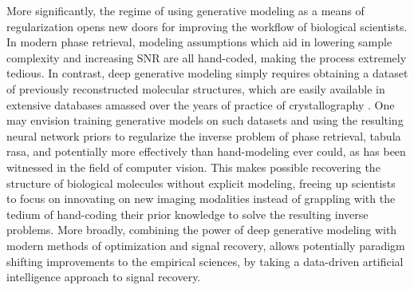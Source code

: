 \documentclass[11pt]{article}
\begin{document}
 More significantly, the regime of using generative modeling as a means of regularization opens new doors for improving the workflow of biological scientists. In modern phase retrieval, modeling assumptions which aid in lowering sample complexity and increasing SNR are all hand-coded, making the process extremely tedious. In contrast, deep generative modeling simply requires obtaining a dataset of previously reconstructed molecular structures, which are easily available in extensive databases amassed over the years of practice of crystallography \cite{velankar2009pdbe}. One may envision training generative models on such datasets and using the resulting neural network priors to regularize the inverse problem of phase retrieval, tabula rasa, and potentially more effectively than hand-modeling ever could, as has been witnessed in the field of computer vision. This makes possible recovering the structure of biological molecules without explicit modeling, freeing up scientists to focus on innovating on new imaging modalities instead of grappling with the tedium of hand-coding their prior knowledge to solve the resulting inverse problems. More broadly, combining the power of deep generative modeling with modern methods of optimization and signal recovery, allows potentially paradigm shifting improvements to the empirical sciences, by taking a data-driven artificial intelligence approach to signal recovery. 



\end{document}
